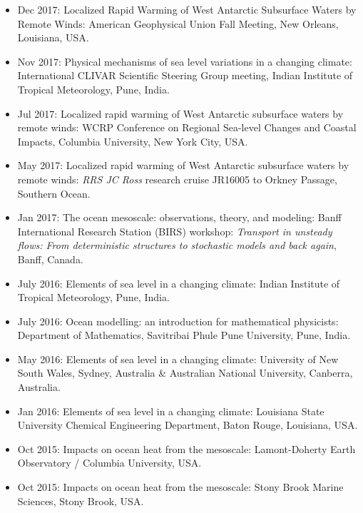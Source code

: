 \documentclass{article}
\begin{document}
\begin{itemize}[leftmargin=*]
\item Dec 2017: {\sc Localized Rapid Warming of West Antarctic Subsurface Waters by Remote Winds}: American Geophysical Union Fall Meeting, New Orleans, Louisiana, USA. 

\item Nov 2017: {\sc Physical mechanisms of sea level variations in a changing climate}: International CLIVAR Scientific Steering Group meeting, Indian Institute of Tropical Meteorology, Pune, India.


\item Jul 2017: {\sc Localized rapid warming of West Antarctic
    subsurface waters by remote winds}: WCRP Conference on Regional
  Sea-level Changes and Coastal Impacts, Columbia University, New York City, USA. 

\item May 2017: {\sc Localized rapid warming of West Antarctic
    subsurface waters by remote winds}: {\it RRS JC Ross} research cruise
  JR16005 to Orkney Passage, Southern Ocean.

\item Jan 2017: {\sc The ocean mesoscale: observations, theory, and
    modeling}: Banff International Research Station (BIRS) workshop:
  {\it Transport in unsteady flows: From deterministic structures to
    stochastic models and back again}, Banff, Canada.

\item July 2016: {\sc Elements of sea level in a changing climate}:
  Indian Institute of Tropical Meteorology, Pune, India.

\item July 2016: {\sc Ocean modelling: an introduction for
    mathematical physicists}: Department of Mathematics, Savitribai
  Phule Pune University, Pune, India.

\item May 2016: {\sc Elements of sea level in a changing climate}:
  University of New South Wales, Sydney, Australia \& Australian
  National University, Canberra, Australia.

\item Jan 2016: {\sc Elements of sea level in a changing climate}:
  Louisiana State University Chemical Engineering Department, Baton
  Rouge, Louisiana, USA.

\item Oct 2015: {\sc Impacts on ocean heat from the mesoscale}:
  Lamont-Doherty Earth Observatory / Columbia University, USA.

\item Oct 2015: {\sc Impacts on ocean heat from the mesoscale}: Stony
  Brook Marine Sciences, Stony Brook, USA.


\end{itemize}
\end{document}
